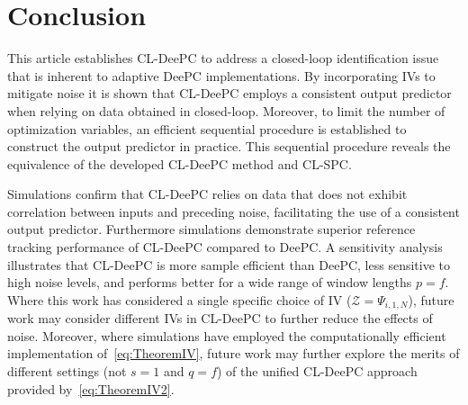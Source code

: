 \section{Conclusion}\label{sec:conclusion}
%
\noindent This article establishes \ac{CL-DeePC} to address a closed-loop identification issue that is inherent to adaptive \ac{DeePC} implementations. By incorporating \ac{IVs} to mitigate noise it is shown that \ac{CL-DeePC} employs a consistent output predictor when relying on data obtained in closed-loop. Moreover, to limit the number of optimization variables, an efficient sequential procedure is established to construct the output predictor in practice. This sequential procedure reveals the equivalence of the developed \ac{CL-DeePC} method and \ac{CL-SPC}.

Simulations confirm that \ac{CL-DeePC} relies on data that does not exhibit correlation between inputs and preceding noise, facilitating the use of a consistent output predictor. Furthermore simulations demonstrate superior reference tracking performance of \ac{CL-DeePC} compared to \ac{DeePC}. A sensitivity analysis illustrates that \ac{CL-DeePC} is more sample efficient than \ac{DeePC}, less sensitive to high noise levels, and performs better for a wide range of window lengths $p=f$. Where this work has considered a single specific choice of \acs{IV} ($\mathcal{Z}=\Psi_{i,1,N}$), future work may consider different \ac{IVs} in \ac{CL-DeePC} to further reduce the effects of noise. Moreover, where simulations have employed the computationally efficient implementation of~\eqref{eq:TheoremIV}, future work may further explore the merits of different settings (not $s=1$ and $q=f$) of the unified \ac{CL-DeePC} approach provided by~\eqref{eq:TheoremIV2}.